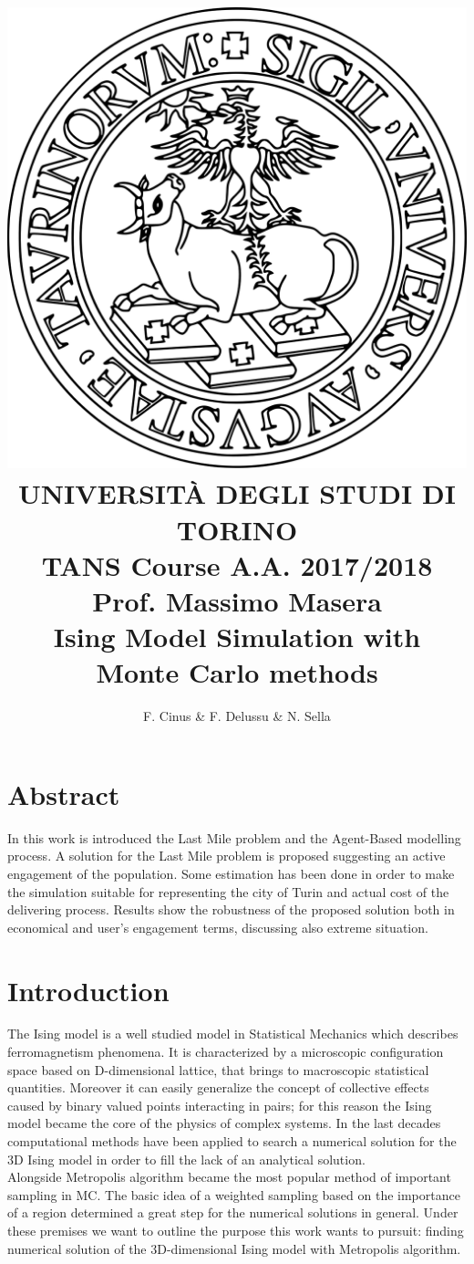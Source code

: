 \documentclass[11pt,a4paper]{article}
\author{F. Cinus \& F. Delussu \& N. Sella}
\title{\includegraphics[scale=0.12]{Unito-logo} \\ \LARGE{UNIVERSIT\`{A} DEGLI STUDI DI TORINO} 
\\
TANS Course A.A. 2017/2018 Prof. Massimo Masera
\\
 \textbf{Ising Model Simulation with Monte Carlo methods}
}
\begin{document}
\date{}
\maketitle
\bigskip
\section*{Abstract}
In this work is introduced the Last Mile problem and the Agent-Based modelling process.
A solution for the Last Mile problem is proposed suggesting an active engagement of the population.
Some estimation has been done in order to make the simulation suitable for representing the city of Turin and actual cost of the delivering process.
Results show the robustness of the proposed solution both in economical and user's engagement terms, discussing also extreme situation.

\newpage
\section*{Introduction}
The Ising model is a well studied model in Statistical Mechanics which describes ferromagnetism phenomena. It is characterized by a microscopic configuration space based on D-dimensional lattice, that brings to macroscopic statistical quantities. Moreover it can easily generalize the concept of collective effects caused by binary valued points interacting in pairs; for this reason the Ising model became the core of the physics of complex systems. In the last decades computational methods have been applied to search a numerical solution for the 3D Ising model in order to  fill the lack of an analytical solution.  
\\
Alongside Metropolis algorithm became the most popular method of important sampling in MC. The basic idea of a weighted sampling based on the importance of a region determined a great step for the numerical solutions in general. Under these premises we want to outline the purpose this work wants to pursuit: finding numerical solution of the 3D-dimensional Ising model with Metropolis algorithm.
\end{document}

